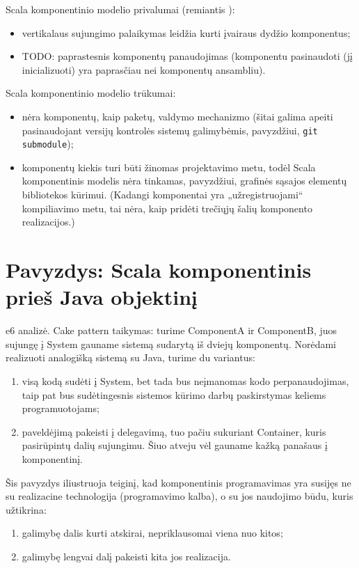 Scala komponentinio modelio privalumai (remiantis
\cite{classification-framework-for-scm}):
\begin{itemize}
  \item vertikalaus sujungimo\cite[599]{classification-framework-for-scm}
    palaikymas leidžia kurti įvairaus dydžio  komponentus;
  \item TODO: paprastesnis komponentų panaudojimas (komponentu
    pasinaudoti (jį inicializuoti) yra paprasčiau nei komponentų
    ansambliu).
\end{itemize}

Scala komponentinio modelio trūkumai:
\begin{itemize}
  \item nėra komponentų, kaip paketų, valdymo mechanizmo (šitai galima
    apeiti pasinaudojant versijų kontrolės sistemų galimybėmis,
    pavyzdžiui, \verb|git submodule|);
  \item komponentų kiekis turi būti žinomas projektavimo metu, todėl
    Scala komponentinis modelis nėra tinkamas, pavyzdžiui,
    grafinės sąsajos elementų bibliotekos 
    kūrimui. (Kadangi komponentai yra „užregistruojami“
    kompiliavimo metu, tai nėra, kaip pridėti trečiųjų šalių
    komponento realizacijos.)
\end{itemize}

\section{Pavyzdys: Scala komponentinis prieš Java objektinį}

e6 analizė. Cake pattern taikymas: turime ComponentA ir ComponentB,
juos sujungę į System gauname sistemą sudarytą iš dviejų komponentų.
Norėdami realizuoti analogišką sistemą su Java, turime du variantus:
\begin{enumerate}
  \item visą kodą sudėti į System, bet tada bus neįmanomas kodo
    perpanaudojimas, taip pat bus sudėtingesnis sistemos kūrimo
    darbų paskirstymas keliems programuotojams;
  \item \label{scala:exmp:enum:2} paveldėjimą pakeisti į delegavimą,
    tuo pačiu sukuriant Container, kuris pasirūpintų dalių
    sujungimu. Šiuo atveju vėl gauname kažką panašaus į
    komponentinį.
\end{enumerate}

Šis pavyzdys iliustruoja teiginį, kad komponentinis programavimas yra
susijęs ne su realizacine technologija (programavimo kalba), o su
jos naudojimo būdu, kuris užtikrina:
\begin{enumerate}
  \item galimybę dalis kurti atskirai, nepriklausomai viena nuo kitos;
  \item galimybę lengvai dalį pakeisti kita jos realizacija.
\end{enumerate}


